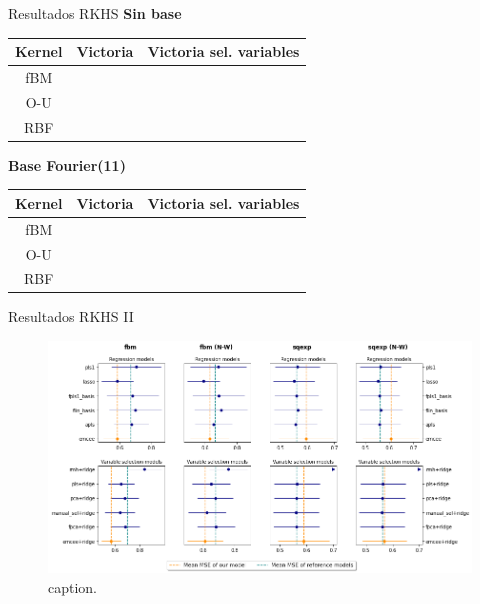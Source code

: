 \documentclass[10pt, spanish, professionalfonts]{beamer}
\newcommand{\cmark}{\ding{51}}%
\newcommand{\xmark}{\ding{55}}%
\begin{document}
\begin{frame}{Resultados RKHS}
\textbf{Sin base}
  \begin{table}
    \begin{tabular}{c|cc}
      Kernel & Victoria & Victoria sel. variables \\ \hline
      fBM & \cmark & \cmark\\
      O-U & \cmark & \cmark\\
      RBF & \cmark & \cmark
    \end{tabular}
  \end{table}

  \textbf{Base Fourier(11)}
  \begin{table}
    \begin{tabular}{c|cc}
      Kernel & Victoria & Victoria sel. variables \\ \hline
      fBM & \cmark &  \cmark\\
      O-U & \cmark & \xmark\\
      RBF & \cmark & \cmark
    \end{tabular}
  \end{table}
\end{frame}

\begin{frame}{Resultados RKHS II}
  \begin{figure}
    \includegraphics[width=\textwidth]{img/res/reg_emcee_rkhs_fixed}
    \caption{caption.}
  \end{figure}
\end{frame}
\end{document}
